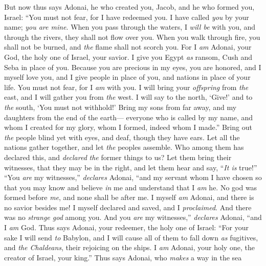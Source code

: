 \begin{biblechapter} %
 But now thus says Adonai,
\verse he who created you, Jacob, 
and he who formed you, Israel: 
“You must not fear, for I have redeemed you. 
I have called \textit{you} by your name; \textit{you are mine}.
\verse When you pass through the waters, I \textit{will be} with you, 
and through the rivers, they shall not flow over you. 
When you walk through fire, you shall not be burned, 
and \textit{the} flame shall not scorch you.
\verse For I \textit{am} Adonai, your God, 
the holy one of Israel, your savior. 
I give you Egypt \textit{as} ransom, 
Cush and Seba in place of you.
\verse Because you are precious in my eyes, 
you are honored, and I myself love you, 
and I give people in place of you, 
and nations in place of your life.
\verse You must not fear, 
for I \textit{am} with you. 
I will bring your \textit{offspring} from \textit{the} east, 
and I will gather you from \textit{the} west.
\verse I will say to the north, ‘Give!’ 
and to \textit{the} south, ‘You must not withhold!’ 
Bring my sons from far away, 
and my daughters from the end of the earth—
\verse everyone who is called by my name, 
and whom I created for my glory, 
whom I formed, 
indeed whom I made.”
\verse Bring out \textit{the} people blind yet with eyes, 
and deaf, though they have ears.
\verse Let all the nations gather together, 
and let \textit{the} peoples assemble. 
Who among them has declared this, 
and \textit{declared} \textit{the} former things to us? 
Let them bring their witnesses, that they may be in the right, 
and let them hear and say, “\textit{It is} true!”
\verse “You \textit{are} my witnesses,” \textit{declares} Adonai, 
“and my servant whom I have chosen 
so that you may know and believe \textit{in} me 
and understand that I \textit{am} he. 
No god was formed before \textit{me}, 
and none shall be after me.
\verse I myself \textit{am} Adonai, 
and there is no savior besides me!
\verse I myself declared and saved, 
and I \textit{proclaimed}. And there was no \textit{strange god} among you. 
And you \textit{are} my witnesses,” \textit{declares} Adonai, 
“and I \textit{am} God.
 Thus says Adonai, your redeemer, 
the holy one of Israel: 
“For your sake I will send \textit{to} Babylon, 
and I will cause all of them to fall down \textit{as} fugitives, 
and \textit{the Chaldeans}, their rejoicing on the ships.
\verse I \textit{am} Adonai, your holy one, 
the creator of Israel, your king.”
\verse Thus says Adonai, who \textit{makes} a way in the sea 

\end{biblechapter}
